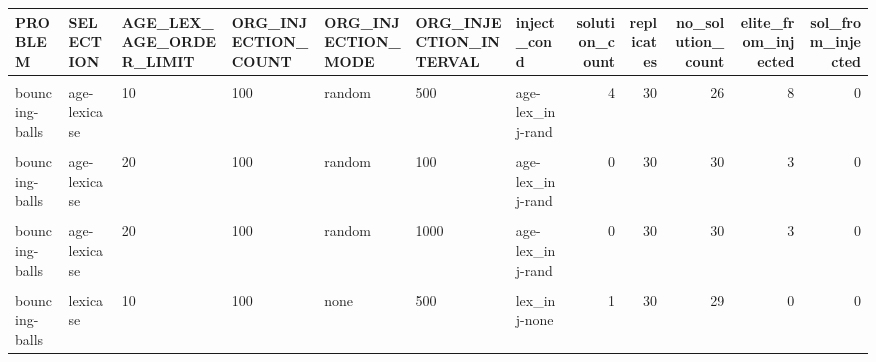 \documentclass[
]{book}
\begin{document}
\begin{table}
\centering\begingroup\fontsize{25}{27}\selectfont

\begin{tabular}{l|l|l|l|l|l|l|r|r|r|r|r}
\hline
PROBLEM & SELECTION & AGE\_LEX\_AGE\_ORDER\_LIMIT & ORG\_INJECTION\_COUNT & ORG\_INJECTION\_MODE & ORG\_INJECTION\_INTERVAL & inject\_cond & solution\_count & replicates & no\_solution\_count & elite\_from\_injected & sol\_from\_injected\\
\hline
\cellcolor{gray!6}{bouncing-balls} & \cellcolor{gray!6}{age-lexicase} & \cellcolor{gray!6}{10} & \cellcolor{gray!6}{100} & \cellcolor{gray!6}{random} & \cellcolor{gray!6}{100} & \cellcolor{gray!6}{age-lex\_inj-rand} & \cellcolor{gray!6}{1} & \cellcolor{gray!6}{30} & \cellcolor{gray!6}{29} & \cellcolor{gray!6}{6} & \cellcolor{gray!6}{0}\\
\hline
bouncing-balls & age-lexicase & 10 & 100 & random & 500 & age-lex\_inj-rand & 4 & 30 & 26 & 8 & 0\\
\hline
\cellcolor{gray!6}{bouncing-balls} & \cellcolor{gray!6}{age-lexicase} & \cellcolor{gray!6}{10} & \cellcolor{gray!6}{100} & \cellcolor{gray!6}{random} & \cellcolor{gray!6}{1000} & \cellcolor{gray!6}{age-lex\_inj-rand} & \cellcolor{gray!6}{1} & \cellcolor{gray!6}{30} & \cellcolor{gray!6}{29} & \cellcolor{gray!6}{6} & \cellcolor{gray!6}{0}\\
\hline
bouncing-balls & age-lexicase & 20 & 100 & random & 100 & age-lex\_inj-rand & 0 & 30 & 30 & 3 & 0\\
\hline
\cellcolor{gray!6}{bouncing-balls} & \cellcolor{gray!6}{age-lexicase} & \cellcolor{gray!6}{20} & \cellcolor{gray!6}{100} & \cellcolor{gray!6}{random} & \cellcolor{gray!6}{500} & \cellcolor{gray!6}{age-lex\_inj-rand} & \cellcolor{gray!6}{1} & \cellcolor{gray!6}{30} & \cellcolor{gray!6}{29} & \cellcolor{gray!6}{3} & \cellcolor{gray!6}{0}\\
\hline
bouncing-balls & age-lexicase & 20 & 100 & random & 1000 & age-lex\_inj-rand & 0 & 30 & 30 & 3 & 0\\
\hline
\cellcolor{gray!6}{bouncing-balls} & \cellcolor{gray!6}{lexicase} & \cellcolor{gray!6}{10} & \cellcolor{gray!6}{100} & \cellcolor{gray!6}{none} & \cellcolor{gray!6}{100} & \cellcolor{gray!6}{lex\_inj-none} & \cellcolor{gray!6}{3} & \cellcolor{gray!6}{30} & \cellcolor{gray!6}{27} & \cellcolor{gray!6}{0} & \cellcolor{gray!6}{0}\\
\hline
bouncing-balls & lexicase & 10 & 100 & none & 500 & lex\_inj-none & 1 & 30 & 29 & 0 & 0\\

\end{tabular}
\end{table}
\end{document}
